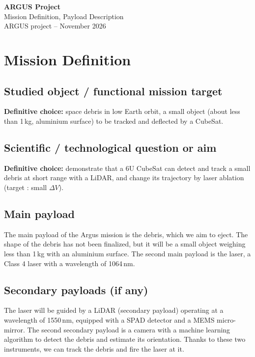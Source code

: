 \documentclass[11pt,a4paper]{article}
\begin{document}
\begin{center}
{\Large \textbf{ARGUS Project}}\\[0.3em]
{\large Mission Definition, Payload Description}\\[0.5em]
ARGUS project -- November 2026
\end{center}

\small
\tableofcontents
\normalsize

\section{Mission Definition}

\subsection{Studied object / functional mission target}
\textbf{Definitive choice:} space debris in low Earth orbit, a small object (about  less than 1\,kg, aluminium surface) to be tracked and deflected by a CubeSat.

\subsection{Scientific / technological question or aim}
\textbf{Definitive choice:} demonstrate that a 6U CubeSat can detect and track a small debris at short range with a LiDAR, and change its trajectory by laser ablation (target : small $\Delta V$).


\subsection{Main payload}
The main payload of the Argus mission is the debris, which we aim to eject.
The shape of the debris has not been finalized, but it will be a small object weighing less than 1\,kg with an aluminium surface.
The second main payload is the laser, a Class 4 laser with a wavelength of 1064\,nm.

\subsection{Secondary payloads (if any)}
The laser will be guided by a LiDAR (secondary payload) operating at a wavelength of 1550\,nm, equipped with a SPAD detector and a MEMS micro-mirror.
The second secondary payload is a camera with a machine learning algorithm to detect the debris and estimate its orientation.
Thanks to these two instruments, we can track the debris and fire the laser at it.
\end{document}
